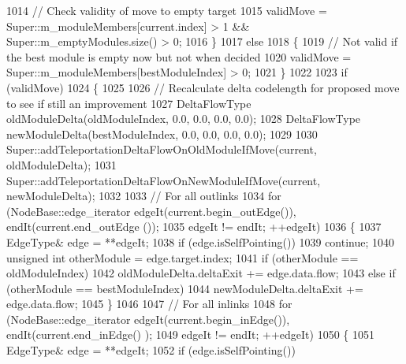 \begin{DoxyCode}
{1014                     \textcolor{comment}{// Check validity of move to empty target}
1015                     validMove = Super::m\_moduleMembers[current.index] > 1 && Super::m\_emptyModules.size() >
       0;
1016                 \}
1017                 \textcolor{keywordflow}{else}
1018                 \{
1019                     \textcolor{comment}{// Not valid if the best module is empty now but not when decided}
1020                     validMove = Super::m\_moduleMembers[bestModuleIndex] > 0;
1021                 \}
1022 
1023                 \textcolor{keywordflow}{if} (validMove)
1024                 \{
1025 
1026                     \textcolor{comment}{// Recalculate delta codelength for proposed move to see if still an improvement}
1027                     DeltaFlowType oldModuleDelta(oldModuleIndex, 0.0, 0.0, 0.0, 0.0);
1028                     DeltaFlowType newModuleDelta(bestModuleIndex, 0.0, 0.0, 0.0, 0.0);
1029 
1030                     Super::addTeleportationDeltaFlowOnOldModuleIfMove(current, oldModuleDelta);
1031                     Super::addTeleportationDeltaFlowOnNewModuleIfMove(current, newModuleDelta);
1032 
1033                     \textcolor{comment}{// For all outlinks}
1034                     \textcolor{keywordflow}{for} (NodeBase::edge\_iterator edgeIt(current.begin\_outEdge()), endIt(current.end\_outEdge
      ());
1035                             edgeIt != endIt; ++edgeIt)
1036                     \{
1037                         EdgeType& edge = **edgeIt;
1038                         \textcolor{keywordflow}{if} (edge.isSelfPointing())
1039                             \textcolor{keywordflow}{continue};
1040                         \textcolor{keywordtype}{unsigned} \textcolor{keywordtype}{int} otherModule = edge.target.index;
1041                         \textcolor{keywordflow}{if} (otherModule == oldModuleIndex)
1042                             oldModuleDelta.deltaExit += edge.data.flow;
1043                         \textcolor{keywordflow}{else} \textcolor{keywordflow}{if} (otherModule == bestModuleIndex)
1044                             newModuleDelta.deltaExit += edge.data.flow;
1045                     \}
1046 
1047                     \textcolor{comment}{// For all inlinks}
1048                     \textcolor{keywordflow}{for} (NodeBase::edge\_iterator edgeIt(current.begin\_inEdge()), endIt(current.end\_inEdge()
      );
1049                             edgeIt != endIt; ++edgeIt)
1050                     \{
1051                         EdgeType& edge = **edgeIt;
1052                         \textcolor{keywordflow}{if} (edge.isSelfPointing())
}
\end{DoxyCode}
